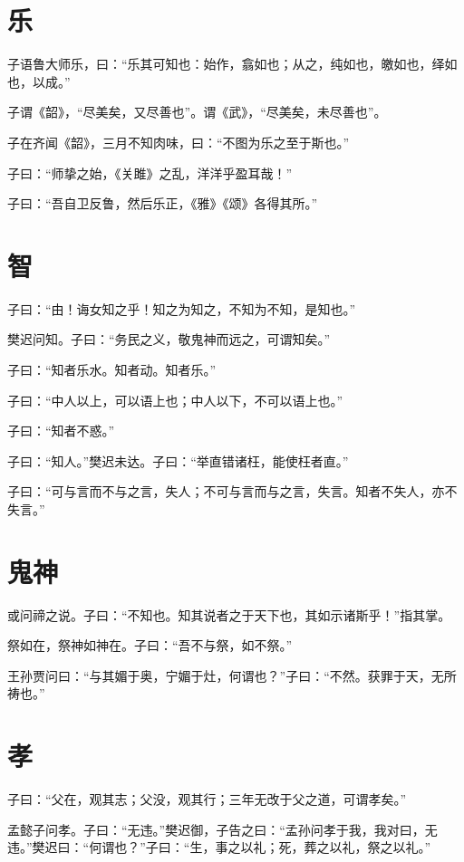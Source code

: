\documentclass[a5paper]{ctexbook}
\begin{document}
    \chapter{乐}

    子语鲁大师乐，曰：“乐其可知也：始作，翕如也；从之，纯如也，皦如也，绎如也，以成。”

    子谓《韶》，“尽美矣，又尽善也”。谓《武》，“尽美矣，未尽善也”。

    子在齐闻《韶》，三月不知肉味，曰：“不图为乐之至于斯也。”

    子曰：“师挚之始，《关雎》之乱，洋洋乎盈耳哉！”

    子曰：“吾自卫反鲁，然后乐正，《雅》《颂》各得其所。”

    \chapter{智}

    子曰：“由！诲女知之乎！知之为知之，不知为不知，是知也。”

    樊迟问知。子曰：“务民之义，敬鬼神而远之，可谓知矣。”
    
    子曰：“知者乐水。知者动。知者乐。”

    子曰：“中人以上，可以语上也；中人以下，不可以语上也。”

    子曰：“知者不惑。”

    子曰：“知人。”樊迟未达。子曰：“举直错诸枉，能使枉者直。”

    子曰：“可与言而不与之言，失人；不可与言而与之言，失言。知者不失人，亦不失言。”

    \chapter{鬼神}

    或问禘之说。子曰：“不知也。知其说者之于天下也，其如示诸斯乎！”指其掌。

    祭如在，祭神如神在。子曰：“吾不与祭，如不祭。”

    王孙贾问曰：“与其媚于奥，宁媚于灶，何谓也？”子曰：“不然。获罪于天，无所祷也。”

    \chapter{孝}

    子曰：“父在，观其志；父没，观其行；三年无改于父之道，可谓孝矣。”

    孟懿子问孝。子曰：“无违。”樊迟御，子告之曰：“孟孙问孝于我，我对曰，无违。”樊迟曰：“何谓也？”子曰：“生，事之以礼；死，葬之以礼，祭之以礼。”
\end{document}

